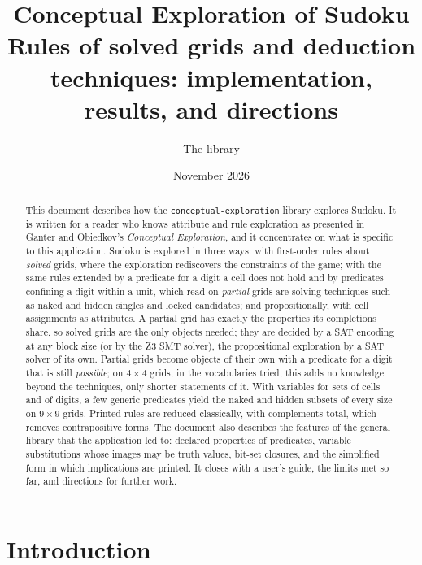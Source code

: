 \documentclass[11pt,a4paper]{article}
\title{Conceptual Exploration of Sudoku\\[4pt]
\large Rules of solved grids and deduction techniques: implementation, results, and directions}
\author{The \code{conceptual-exploration} library}
\date{November 2026}
\theoremstyle{definition}
\theoremstyle{remark}
\newcommand{\code}[1]{\texttt{#1}}
\begin{document}
\maketitle

\begin{abstract}
This document describes how the \code{conceptual-exploration} library explores Sudoku. It is written for a reader who knows attribute and rule exploration as presented in Ganter and Obiedkov's \emph{Conceptual Exploration}, and it concentrates on what is specific to this application. Sudoku is explored in three ways: with first-order rules about \emph{solved} grids, where the exploration rediscovers the constraints of the game; with the same rules extended by a predicate for a digit a cell does not hold and by predicates confining a digit within a unit, which read on \emph{partial} grids are solving techniques such as naked and hidden singles and locked candidates; and propositionally, with cell assignments as attributes. A partial grid has exactly the properties its completions share, so solved grids are the only objects needed; they are decided by a SAT encoding at any block size (or by the Z3 SMT solver), the propositional exploration by a SAT solver of its own. Partial grids become objects of their own with a predicate for a digit that is still \emph{possible}; on $4 \times 4$ grids, in the vocabularies tried, this adds no knowledge beyond the techniques, only shorter statements of it. With variables for sets of cells and of digits, a few generic predicates yield the naked and hidden subsets of every size on $9 \times 9$ grids. Printed rules are reduced classically, with complements total, which removes contrapositive forms. The document also describes the features of the general library that the application led to: declared properties of predicates, variable substitutions whose images may be truth values, bit-set closures, and the simplified form in which implications are printed. It closes with a user's guide, the limits met so far, and directions for further work.
\end{abstract}

\tableofcontents

\section{Introduction}
\end{document}
